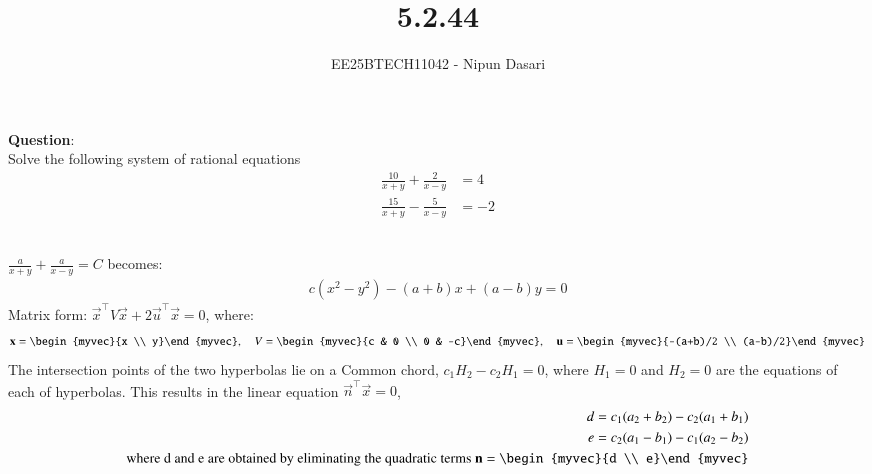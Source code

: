 \documentclass[journal]{IEEEtran}
\begin{document}
	
	
	\vspace{3cm}
	
	\title{5.2.44}
	\author{EE25BTECH11042 - Nipun Dasari}
	\maketitle
	
	\renewcommand{\thefigure}{\theenumi}
	\renewcommand{\thetable}{\theenumi}
	\setlength{\intextsep}{10pt}
	
	\renewcommand{\thetable}{\theenumi}
	
	\textbf{Question}:\\
	Solve the following system of rational equations
	\begin{align}
		\frac{10}{x+y}+\frac{2}{x-y} &= 4 \\
		\frac{15}{x+y}-\frac{5}{x-y} &= -2
	\end{align}
	
	\solution \\
	 $\frac{a}{x+y} + \frac{a}{x-y} = C$ becomes:
	\begin{align}
		c(x^2 - y^2) - (a+b)x + (a-b)y = 0 \label{eq:hyperbola_form}
	\end{align}
	Matrix form: $\vec{x}^\top V \vec{x} + 2\vec{u}^\top \vec{x} = 0$, where:
	\begin{align}
		\vec{x} = \begin{myvec}{x \\ y}\end{myvec}, \quad
		V = \begin{myvec}{c & 0 \\ 0 & -c}\end{myvec}, \quad
		\vec{u} = \begin{myvec}{-(a+b)/2 \\ (a-b)/2}\end{myvec} \label{eq:matrix_defs}
	\end{align}
	The intersection points of the two hyperbolas lie on a Common chord, $c_1H_2-c_2H_1=0$, where $H_1=0$ and $H_2=0$ are the equations of each of hyperbolas. This results in the linear equation $\vec{n}^\top\vec{x}=0$,
	\begin{align}
		d = c_1(a_2+b_2) - c_2(a_1+b_1) \label{eq:D_coeff} \\
		e = c_2(a_1-b_1) - c_1(a_2-b_2) \label{eq:E_coeff} \\
		\text{where d and e are obtained by eliminating the quadratic terms  } \vec{n} = \begin{myvec}{d \\ e}\end{myvec}
	\end{align}
	
\end{document}

